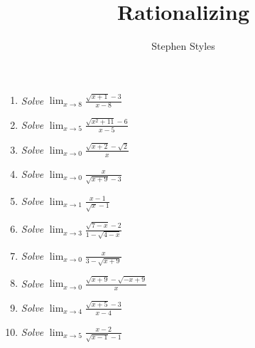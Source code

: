 \documentclass[16pt]{article}
\title{Rationalizing}
\author{Stephen Styles}
\theoremstyle{remark}
\begin{document}
\maketitle

\begin{enumerate}

\item \textit{Solve} $\displaystyle{\lim_{x \rightarrow 8} \frac{\sqrt{x+1} - 3}{x-8} }$
\vspace{5cm}

\item \textit{Solve} $\displaystyle{\lim_{x \rightarrow 5} \frac{\sqrt{x^2+11} - 6}{x-5} }$
\vspace{5cm}

\item \textit{Solve} $\displaystyle{\lim_{x \rightarrow 0} \frac{\sqrt{x+2} - \sqrt{2}}{x} }$
\vspace{5cm}
\newpage
\item \textit{Solve} $\displaystyle{\lim_{x \rightarrow 0} \frac{x}{\sqrt{x+9}-3} }$
\vspace{5cm}

\item \textit{Solve} $\displaystyle{\lim_{x \rightarrow 1} \frac{x-1}{\sqrt{x}-1} }$
\vspace{5cm}

\item \textit{Solve} $\displaystyle{\lim_{x \rightarrow 3} \frac{\sqrt{7-x} - 2}{1-\sqrt{4-x}} }$
\vspace{5cm}
\item \textit{Solve} $\displaystyle{\lim_{x \rightarrow 0} \frac{x}{3-\sqrt{x+9}} }$
\vspace{5cm}

\item \textit{Solve} $\displaystyle{\lim_{x \rightarrow 0} \frac{\sqrt{x+9} - \sqrt{-x+9}}{x} }$
\vspace{5cm}

\item \textit{Solve} $\displaystyle{\lim_{x \rightarrow 4} \frac{\sqrt{x+5} - 3}{x-4} }$
\vspace{5cm}
\item \textit{Solve} $\displaystyle{\lim_{x \rightarrow 5} \frac{x-2}{\sqrt{x-1}-1} }$


\end{enumerate}
\end{document}
